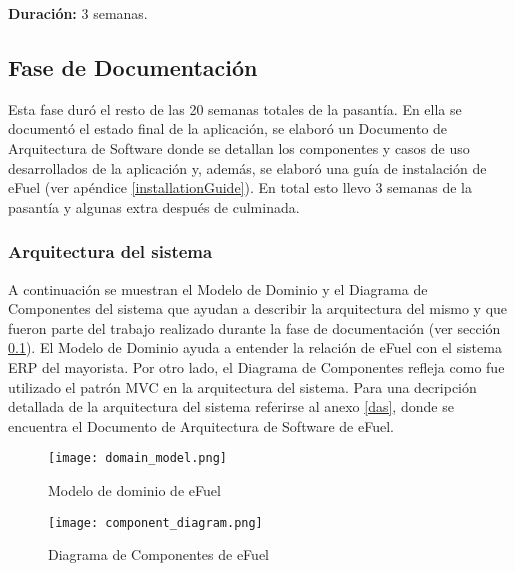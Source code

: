 \textbf{Duración:} 3 semanas.

\subsection{Fase de Documentación} \label{documentation}
Esta fase duró el resto de las 20 semanas totales de la pasantía. En ella se documentó el estado final de la aplicación, se elaboró un Documento de Arquitectura de Software donde se detallan los componentes y casos de uso desarrollados de la aplicación y, además, se elaboró una guía de instalación de eFuel (ver apéndice \ref{installationGuide}). En total esto llevo 3 semanas de la pasantía y algunas extra después de culminada.

\subsubsection{Arquitectura del sistema}
A continuación se muestran el Modelo de Dominio y el Diagrama de Componentes del sistema que ayudan a describir la arquitectura del mismo y que fueron parte del trabajo realizado durante la fase de documentación (ver sección \ref{documentation}). El Modelo de Dominio ayuda a entender la relación de eFuel con el sistema ERP del mayorista. Por otro lado, el Diagrama de Componentes refleja como fue utilizado el patrón MVC en la arquitectura del sistema. Para una decripción detallada de la arquitectura del sistema referirse al anexo \ref{das}, donde se encuentra el Documento de Arquitectura de Software de eFuel.

\begin{figure}[H]
    \texttt{[image: domain\_model.png]}
    \caption{Modelo de dominio de eFuel}
    \label{fig:domain_model}
    \centering
\end{figure}

\begin{figure}[H]
    \texttt{[image: component\_diagram.png]}
    \caption{Diagrama de Componentes de eFuel}
    \label{fig:component_diagram}
    \centering
\end{figure}